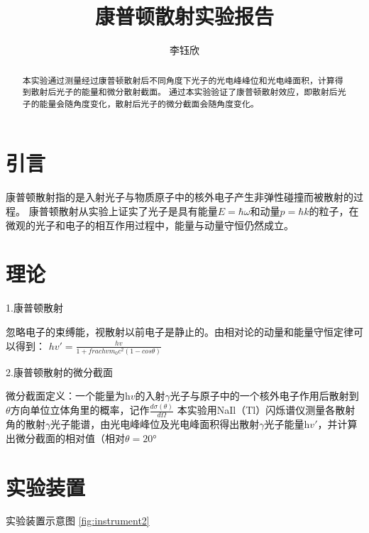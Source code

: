 \documentclass[font=default]{mpltx}
\makeatletter
\newcommand\releasedate{%
    \href{https://github.com/CastleStar14654/PKUMpLtX/releases/tag/\mpltx@fileversion}%
        {\mpltx@filedate, \mpltx@fileversion}}
\makeatother
\begin{document}
\title{康普顿散射实验报告} %
\author{李钰欣} %
\date{}
\begin{abstract}
  本实验通过测量经过康普顿散射后不同角度下光子的光电峰峰位和光电峰面积，计算得到散射后光子的能量和微分散射截面。
  通过本实验验证了康普顿散射效应，即散射后光子的能量会随角度变化，散射后光子的微分截面会随角度变化。
\end{abstract}

\maketitle

\section{引言}

康普顿散射指的是入射光子与物质原子中的核外电子产生非弹性碰撞而被散射的过程。
康普顿散射从实验上证实了光子是具有能量$E = \hbar \omega$和动量$p = \hbar k$的粒子，在微观的光子和电子的相互作用过程中，能量与动量守恒仍然成立。

 
\section{理论}\label{sec:theory}
1.康普顿散射

忽略电子的束缚能，视散射以前电子是静止的。由相对论的动量和能量守恒定律可以得到：
$hv' = \frac{hv}{1+ frac{hv}{m_0 c^2}(1-cos \theta)}$

2.康普顿散射的微分截面

微分截面定义：一个能量为h$v$的入射$\gamma$光子与原子中的一个核外电子作用后散射到$\theta$方向单位立体角里的概率，记作$\frac{d \sigma (\theta)}{d \Omega}$
本实验用NaIl（Tl）闪烁谱仪测量各散射角的散射$\gamma$光子能谱，由光电峰峰位及光电峰面积得出散射$\gamma$光子能量h$v'$，并计算出微分截面的相对值（相对$\theta = 20$°

\section{实验装置}
实验装置示意图 \autoref{fig:instrument2}
\end{document}
